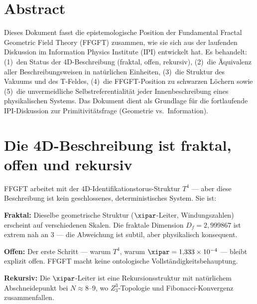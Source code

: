 
\section*{Abstract}

Dieses Dokument fasst die epistemologische Position der Fundamental Fractal Geometric Field Theory (FFGFT) zusammen, wie sie sich aus der laufenden Diskussion im Information Physics Institute (IPI) entwickelt hat. Es behandelt: (1)~den Status der 4D-Beschreibung (fraktal, offen, rekursiv), (2)~die Äquivalenz aller Beschreibungsweisen in natürlichen Einheiten, (3)~die Struktur des Vakuums und des T-Feldes, (4)~die FFGFT-Position zu schwarzen Löchern sowie (5)~die unvermeidliche Selbstreferentialität jeder Innenbeschreibung eines physikalischen Systems. Das Dokument dient als Grundlage für die fortlaufende IPI-Diskussion zur Primitivitätsfrage (Geometrie vs.\ Information).

\tableofcontents
\newpage

\section{Die 4D-Beschreibung ist fraktal, offen und rekursiv}

FFGFT arbeitet mit der 4D-Identifikationstorus-Struktur $T^4$ --- aber diese Beschreibung ist kein geschlossenes, deterministisches System. Sie ist:

\textbf{Fraktal:} Dieselbe geometrische Struktur ($\xipar$-Leiter, Windungszahlen) erscheint auf verschiedenen Skalen. Die fraktale Dimension $D_f = 2{,}999867$ ist extrem nah an 3 --- die Abweichung ist subtil, aber physikalisch konsequent.

\textbf{Offen:} Der erste Schritt --- warum $T^4$, warum $\xipar = 1{,}333 \times 10^{-4}$ --- bleibt explizit offen. FFGFT macht keine ontologische Vollständigkeitsbehauptung.

\textbf{Rekursiv:} Die $\xipar$-Leiter ist eine Rekursionsstruktur mit natürlichem Abschneidepunkt bei $N \approx 8$--$9$, wo $Z_3^3$-Topologie und Fibonacci-Konvergenz zusammenfallen.

